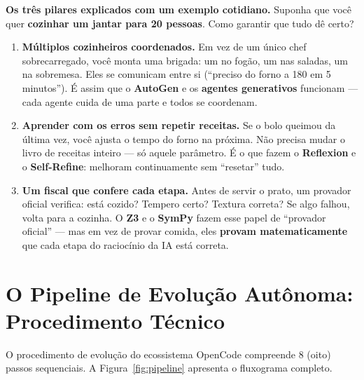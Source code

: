 \documentclass[
  article,
  12pt,
  oneside,
  a4paper,
  brazil,
  sumario=tradicional
]{abntex2}
\begin{document}
\begin{leigosbox}
\textbf{Os três pilares explicados com um exemplo cotidiano.} Suponha que você quer \textbf{cozinhar um jantar para 20 pessoas}. Como garantir que tudo dê certo?

\begin{enumerate}
\item[\textbf{Pilar 1}] \textbf{Múltiplos cozinheiros coordenados.} Em vez de um único chef sobrecarregado, você monta uma brigada: um no fogão, um nas saladas, um na sobremesa. Eles se comunicam entre si (``preciso do forno a 180\textdegree{} em 5 minutos''). É assim que o \textbf{AutoGen} e os \textbf{agentes generativos} funcionam --- cada agente cuida de uma parte e todos se coordenam.

\item[\textbf{Pilar 2}] \textbf{Aprender com os erros sem repetir receitas.} Se o bolo queimou da última vez, você ajusta o tempo do forno na próxima. Não precisa mudar o livro de receitas inteiro --- só aquele parâmetro. É o que fazem o \textbf{Reflexion} e o \textbf{Self-Refine}: melhoram continuamente sem ``resetar'' tudo.

\item[\textbf{Pilar 3}] \textbf{Um fiscal que confere cada etapa.} Antes de servir o prato, um provador oficial verifica: está cozido? Tempero certo? Textura correta? Se algo falhou, volta para a cozinha. O \textbf{Z3} e o \textbf{SymPy} fazem esse papel de ``provador oficial'' --- mas em vez de provar comida, eles \textbf{provam matematicamente} que cada etapa do raciocínio da IA está correta.
\end{enumerate}
\end{leigosbox}

\section{O Pipeline de Evolução Autônoma: Procedimento Técnico}

O procedimento de evolução do ecossistema OpenCode compreende 8 (oito) passos sequenciais. A Figura~\ref{fig:pipeline} apresenta o fluxograma completo.
\end{document}
